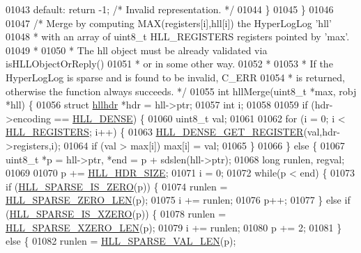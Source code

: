 \begin{DoxyCode}
{{01043     \textcolor{keywordflow}{default}: \textcolor{keywordflow}{return} -1; \textcolor{comment}{/* Invalid representation. */}
01044     \}
01045 \}
01046 
01047 \textcolor{comment}{/* Merge by computing MAX(registers[i],hll[i]) the HyperLogLog 'hll'}
01048 \textcolor{comment}{ * with an array of uint8\_t HLL\_REGISTERS registers pointed by 'max'.}
01049 \textcolor{comment}{ *}
01050 \textcolor{comment}{ * The hll object must be already validated via isHLLObjectOrReply()}
01051 \textcolor{comment}{ * or in some other way.}
01052 \textcolor{comment}{ *}
01053 \textcolor{comment}{ * If the HyperLogLog is sparse and is found to be invalid, C\_ERR}
01054 \textcolor{comment}{ * is returned, otherwise the function always succeeds. */}
01055 \textcolor{keywordtype}{int} hllMerge(uint8\_t *max, robj *hll) \{
01056     \textcolor{keyword}{struct} \hyperlink{structhllhdr}{hllhdr} *hdr = hll->ptr;
01057     \textcolor{keywordtype}{int} i;
01058 
01059     \textcolor{keywordflow}{if} (hdr->encoding == \hyperlink{hyperloglog_8c_a5f2ead2492fc9cc4ff39f8c1752875a1}{HLL\_DENSE}) \{
01060         uint8\_t val;
01061 
01062         \textcolor{keywordflow}{for} (i = 0; i < \hyperlink{hyperloglog_8c_aa053beb90136828dcb46545c7445fc36}{HLL\_REGISTERS}; i++) \{
01063             \hyperlink{hyperloglog_8c_abace3387aeb1543c9bcbd0d9a62c7ebc}{HLL\_DENSE\_GET\_REGISTER}(val,hdr->registers,i);
01064             \textcolor{keywordflow}{if} (val > max[i]) max[i] = val;
01065         \}
01066     \} \textcolor{keywordflow}{else} \{
01067         uint8\_t *p = hll->ptr, *end = p + sdslen(hll->ptr);
01068         \textcolor{keywordtype}{long} runlen, regval;
01069 
01070         p += \hyperlink{hyperloglog_8c_af04dc163054c4c79b0e6c93057b4032f}{HLL\_HDR\_SIZE};
01071         i = 0;
01072         \textcolor{keywordflow}{while}(p < end) \{
01073             \textcolor{keywordflow}{if} (\hyperlink{hyperloglog_8c_a0b65ae2290df116ae4ed18188dffb5ad}{HLL\_SPARSE\_IS\_ZERO}(p)) \{
01074                 runlen = \hyperlink{hyperloglog_8c_a0ed89a76f49a89991af87cce34c3260b}{HLL\_SPARSE\_ZERO\_LEN}(p);
01075                 i += runlen;
01076                 p++;
01077             \} \textcolor{keywordflow}{else} \textcolor{keywordflow}{if} (\hyperlink{hyperloglog_8c_ac672e0af491e4cbfe7a5859ae4dc74f9}{HLL\_SPARSE\_IS\_XZERO}(p)) \{
01078                 runlen = \hyperlink{hyperloglog_8c_a95fbeb27967ea46816fd354ddb59564e}{HLL\_SPARSE\_XZERO\_LEN}(p);
01079                 i += runlen;
01080                 p += 2;
01081             \} \textcolor{keywordflow}{else} \{
01082                 runlen = \hyperlink{hyperloglog_8c_a5c74b3b50c822c01c1976a72b84db12f}{HLL\_SPARSE\_VAL\_LEN}(p);
}}
\end{DoxyCode}

